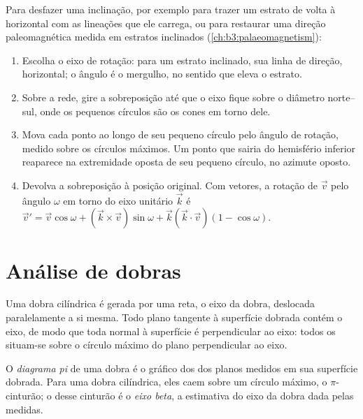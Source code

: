 \begin{method}\label{met:b3:structural-analysis:rotation}
Para desfazer uma inclinação, por exemplo para trazer um estrato de volta à horizontal com as
lineações que ele carrega, ou para restaurar uma direção paleomagnética medida em estratos
inclinados (\cref{ch:b3:palaeomagnetism}):
\begin{enumerate}
  \item Escolha o eixo de rotação: para um estrato inclinado, sua linha de direção,
        horizontal; o ângulo é o mergulho, no sentido que eleva o estrato.
  \item Sobre a rede, gire a sobreposição até que o eixo fique sobre o
        diâmetro norte--sul, onde os pequenos círculos são os cones em torno
        dele.
  \item Mova cada ponto ao longo de seu pequeno círculo pelo ângulo de rotação,
        medido sobre os círculos máximos. Um ponto que sairia do hemisfério inferior
        reaparece na extremidade oposta de seu pequeno círculo, no
        azimute oposto.
  \item Devolva a sobreposição à posição original. Com vetores, a rotação de $\vec v$ pelo
        ângulo $\omega$ em torno do eixo unitário $\vec k$ é $\vec v' = \vec v
        \cos\omega + (\vec k\times\vec v)\sin\omega + \vec k(\vec k\cdot\vec
        v)(1 - \cos\omega)$.
\end{enumerate}
\end{method}

\section{Análise de dobras}\label{sec:b3:structural-analysis:folds}

Uma dobra cilíndrica é gerada por uma reta, o eixo da dobra, deslocada
paralelamente a si mesma. Todo plano tangente à superfície dobrada contém o
eixo, de modo que toda normal à superfície é perpendicular ao eixo: todos os
 situam-se sobre o círculo máximo do plano perpendicular ao eixo.

\begin{definition}\label{def:b3:structural-analysis:pi}
O \emph{diagrama pi} de uma dobra é o gráfico dos  dos
planos medidos em sua superfície dobrada. Para uma dobra cilíndrica, eles caem sobre
um círculo máximo, o $\pi$-cinturão; o  desse cinturão é o
\emph{eixo beta}, a estimativa do eixo da dobra dada pelas
medidas.
\end{definition}

